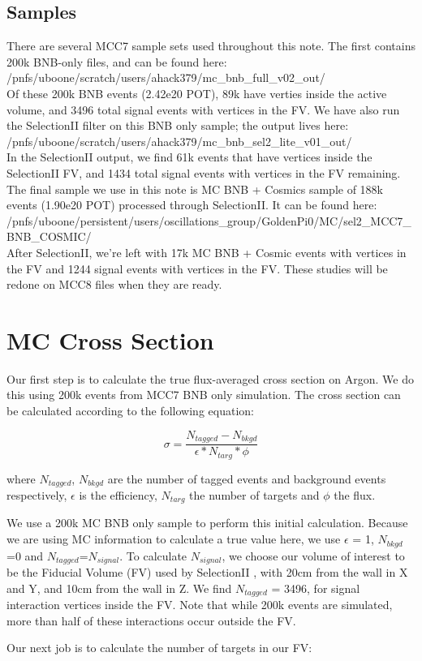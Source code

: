 \documentclass[a4paper]{article}
\begin{document}
\subsection{Samples}
There are several MCC7 sample sets used throughout this note.  The first contains 200k BNB-only files, and can be found here:\\
/pnfs/uboone/scratch/users/ahack379/mc\_bnb\_full\_v02\_out/
\\ Of these 200k BNB events (2.42e20 POT), 89k have verties inside the active volume, and 3496 total signal events with vertices in the FV.  
\noindent We have also run the SelectionII filter on this BNB only sample; the output lives here:\\
/pnfs/uboone/scratch/users/ahack379/mc\_bnb\_sel2\_lite\_v01\_out/
\\In the SelectionII output, we find 61k events that have vertices inside the SelectionII FV, and 1434 total signal events with vertices in the FV remaining.
\\The final sample we use in this note is MC BNB + Cosmics sample of 188k events (1.90e20 POT) processed through SelectionII. It can be found here:\\
/pnfs/uboone/persistent/users/oscillations\_group/GoldenPi0/MC/sel2\_MCC7\_BNB\_COSMIC/ \\
\noindent After SelectionII, we're left with 17k MC BNB + Cosmic events with vertices in the FV and 1244 signal events with vertices in the FV. These studies will be redone on MCC8 files when they are ready.

\section{MC Cross Section}
Our first step is to calculate the true flux-averaged cross section on Argon. We do this using 200k events from MCC7 BNB only simulation.  The cross section can be calculated according to the following equation:

\begin{equation}
  \sigma = \frac{N_{tagged} - N_{bkgd}}{\epsilon*N_{targ}*\phi}
\end{equation}

\noindent where $N_{tagged}$, $N_{bkgd}$ are the number of tagged events and background events respectively, $\epsilon$ is the efficiency, $N_{targ}$ the number of targets and $\phi$ the flux. 
\par We use a 200k MC BNB only sample to perform this initial calculation.  Because we are using MC information to calculate a true value here, we use $\epsilon$ = 1, $N_{bkgd}$=0 and $N_{tagged}$=$N_{signal}$.  To calculate $N_{signal}$, we choose our volume of interest to be the Fiducial Volume (FV) used by SelectionII \cite{bib:numucc}, with 20cm from the wall in X and Y, and 10cm from the wall in Z. We find $N_{tagged}$ = 3496, for signal interaction vertices inside the FV. Note that while 200k events are simulated, more than half of these interactions occur outside the FV. 
\par Our next job is to calculate the number of targets in our FV:
\end{document}

